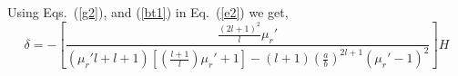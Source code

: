 Using Eqs.~(\ref{g2}), and (\ref{bt1}) in Eq.~(\ref{e2}) we get,
\begin{equation}\label{dt1}
\delta =-\left[\frac{\frac{(2l+1)^2}{l}\mu_r'}{(\mu_r'l+l+1)\left[\left(\frac{l+1}{l}\right)\mu_r'+1\right]-(l+1)\left(\frac{a}{b}\right)^{2l+1}(\mu_r'-1)^2}\right]H    
\end{equation}






